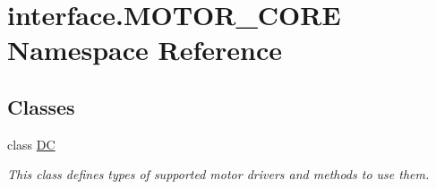 \hypertarget{namespaceinterface_1_1MOTOR__CORE}{}\section{interface.\+M\+O\+T\+O\+R\+\_\+\+C\+O\+R\+E Namespace Reference}
\label{namespaceinterface_1_1MOTOR__CORE}
\subsection*{Classes}
\begin{DoxyCompactItemize}
\item 
class \hyperlink{classinterface_1_1MOTOR__CORE_1_1DC}{D\+C}
\begin{DoxyCompactList}\small\item\em This class defines types of supported motor drivers and methods to use them. \end{DoxyCompactList}\end{DoxyCompactItemize}
